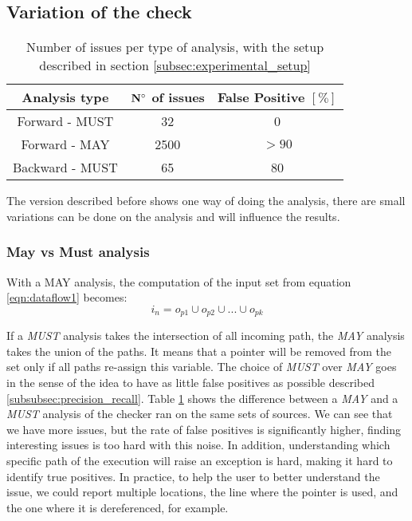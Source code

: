 \subsection{Variation of the check}
\label{subsec:rule_variation}

\begin{table}[h]
	\centering
	\caption{Number of issues per type of analysis, with the setup described in section \ref{subsec:experimental_setup}}
	\label{table:issue_per_analysis_type}
	\begin{tabular}{|c|c|c|}
		\hline
		\bf Analysis type &  \bf $\bf N^{\circ}$  of issues &  \bf False Positive $[\%]$ \\ \hline
		Forward - MUST &  32 &  0 \\ 
		Forward - MAY &  2500 & $> 90$  \\ 
		Backward - MUST &  65 & 80 \\ \hline
	\end{tabular}
\end{table}

The version described before shows one way of doing the analysis, there are small variations can be done on the analysis and will influence the results.

\subsubsection{May vs Must analysis}
\label{subsubsec:may_vs_must}

With a MAY analysis, the computation of the input set from equation \eqref{eqn:dataflow1} becomes:
\begin{equation}\label{eqn:mayvsmust}
i_{n} = o_{p1}  \cup   o_{p2}  \cup  ... \cup   o_{pk}
\end{equation}

If a \emph{MUST} analysis takes the intersection of all incoming path, the \emph{MAY} analysis takes the union of the paths. 
It means that a pointer will be removed from the set only if all paths re-assign this variable.
The choice of \emph{MUST} over \emph{MAY} goes in the sense of the idea to have as little false positives as possible described \ref{subsubsec:precision_recall}.
Table \ref{table:issue_per_analysis_type} shows the difference between a \emph{MAY} and a \emph{MUST} analysis of the checker ran on the same sets of sources.
We can see that we have more issues, but the rate of false positives is significantly higher, finding interesting issues is too hard with this noise. 
In addition, understanding which specific path of the execution will raise an exception is hard, making it hard to identify true positives.
In practice, to help the user to better understand the issue, we could report multiple locations, the line where the pointer is used, and the one where it is dereferenced, for example.

